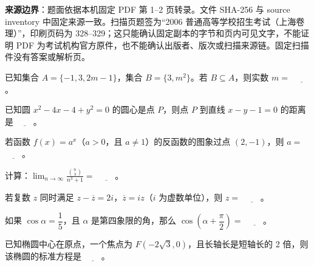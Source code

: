 

\begin{gktip}
\textbf{来源边界}：题面依据本机固定 PDF 第 1–2 页转录。文件 SHA-256 与 source inventory 中固定来源一致。扫描页题签为“2006 普通高等学校招生考试（上海卷理）”，印刷页码为 328–329；这只能确认固定副本的字节和页内可见文字，不能证明 PDF 为考试机构官方原件，也不能确认出版者、版次或扫描来源链。固定扫描件没有答案或解析页。
\end{gktip}


\begin{question}
已知集合 $A=\{-1,3,2m-1\}$，集合 $B=\{3,m^2\}$。若 $B\subseteq A$，则实数 $m=$ $\underline{\qquad}$。

\end{question}
\begin{question}
已知圆 $x^2-4x-4+y^2=0$ 的圆心是点 $P$，则点 $P$ 到直线 $x-y-1=0$ 的距离是 $\underline{\qquad}$。

\end{question}
\begin{question}
若函数 $f(x)=a^x$（$a>0$，且 $a\ne1$）的反函数的图象过点 $(2,-1)$，则 $a=$ $\underline{\qquad}$。

\end{question}
\begin{question}
计算：$\displaystyle\lim_{n\to\infty}\frac{\binom n3}{n^3+1}=$ $\underline{\qquad}$。

\end{question}
\begin{question}
若复数 $z$ 同时满足 $z-\overline z=2i$，$\overline z=iz$（$i$ 为虚数单位），则 $z=$ $\underline{\qquad}$。

\end{question}
\begin{question}
如果 $\cos\alpha=\dfrac15$，且 $\alpha$ 是第四象限的角，那么 $\cos\left(\alpha+\dfrac\pi2\right)=$ $\underline{\qquad}$。

\end{question}
\begin{question}
已知椭圆中心在原点，一个焦点为 $F(-2\sqrt3,0)$，且长轴长是短轴长的 2 倍，则该椭圆的标准方程是 $\underline{\qquad}$。

\end{question}
